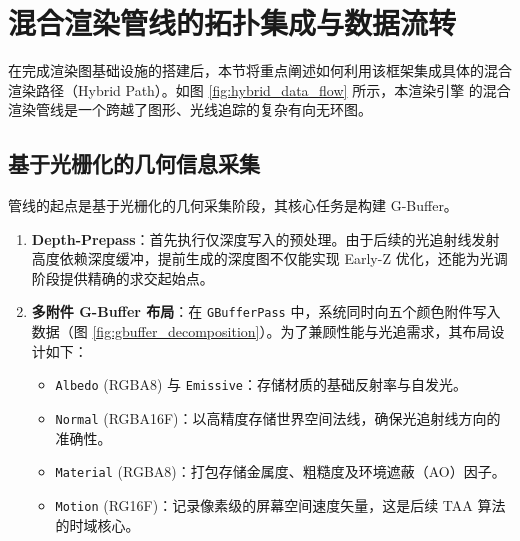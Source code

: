 \section{混合渲染管线的拓扑集成与数据流转}

在完成渲染图基础设施的搭建后，本节将重点阐述如何利用该框架集成具体的混合渲染路径（Hybrid Path）。如图 \ref{fig:hybrid_data_flow} 所示，本渲染引擎 的混合渲染管线是一个跨越了图形、光线追踪的复杂有向无环图。

\subsection{基于光栅化的几何信息采集}
管线的起点是基于光栅化的几何采集阶段，其核心任务是构建 G-Buffer。
\begin{enumerate}
    \item \textbf{Depth-Prepass}：首先执行仅深度写入的预处理。由于后续的光追射线发射高度依赖深度缓冲，提前生成的深度图不仅能实现 Early-Z 优化，还能为光调阶段提供精确的求交起始点。
    \item \textbf{多附件 G-Buffer 布局}：在 \texttt{GBufferPass} 中，系统同时向五个颜色附件写入数据（图 \ref{fig:gbuffer_decomposition}）。为了兼顾性能与光追需求，其布局设计如下：
    \begin{itemize}
        \item \texttt{Albedo} (RGBA8) 与 \texttt{Emissive}：存储材质的基础反射率与自发光。
        \item \texttt{Normal} (RGBA16F)：以高精度存储世界空间法线，确保光追射线方向的准确性。
        \item \texttt{Material} (RGBA8)：打包存储金属度、粗糙度及环境遮蔽（AO）因子。
        \item \texttt{Motion} (RG16F)：记录像素级的屏幕空间速度矢量，这是后续 TAA 算法的时域核心。
    \end{itemize}
\end{enumerate}

